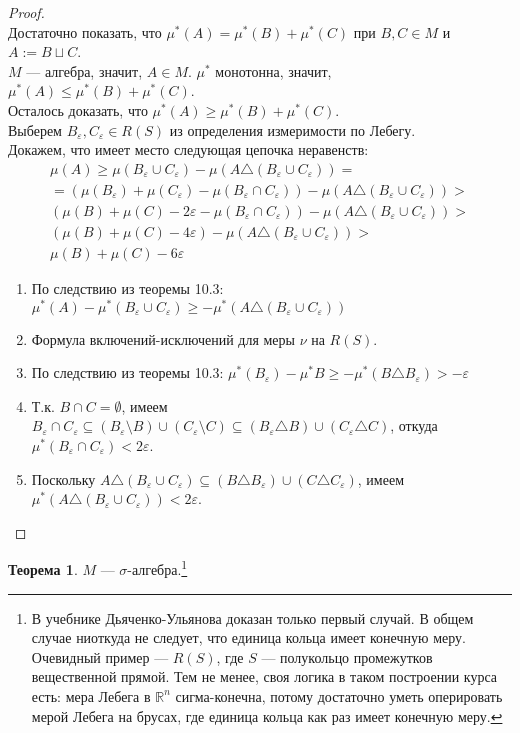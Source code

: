 \documentclass[11pt,a4paper]{report}
\def\eps{\varepsilon}
\def\Real{\mathbb{R}}
\theoremstyle{definition}
\theoremstyle{definition}
\newtheorem{theorem}{Теорема}[section]
\theoremstyle{definition}
\begin{document}
	\begin{proof}$  $\\
		Достаточно показать, что $ \mu^{*}(A) = \mu^{*}(B) + \mu^{*}(C) $ при $ B, C \in M $ и $ A := B \sqcup C $.\\
		$ M $ — алгебра, значит, $ A \in M $. $ \mu^{*} $ монотонна, значит, $ \mu^{*}(A) \le \mu^{*}(B) + \mu^{*}(C) $.\\
		Осталось доказать, что $ \mu^{*}(A) \ge \mu^{*}(B) + \mu^{*}(C) $.\\
		Выберем $ B_{\eps}, C_{\eps} \in R(S) $ из определения измеримости по Лебегу.\\
		Докажем, что имеет место следующая цепочка неравенств:
		\begin{gather}
			\mu(A) \ge \mu(B_{\eps} \cup C_{\eps}) - \mu(A \triangle (B_{\eps} \cup C_{\eps})) =\\
			= (\mu(B_{\eps}) + \mu(C_{\eps}) - \mu(B_{\eps} \cap C_{\eps})) - \mu(A \triangle (B_{\eps} \cup C_{\eps})) >\\
			(\mu(B) + \mu(C) - 2\eps - \mu(B_{\eps} \cap C_{\eps})) - \mu(A \triangle (B_{\eps} \cup C_{\eps})) >\\
			(\mu(B) + \mu(C) - 4\eps) - \mu(A \triangle (B_{\eps} \cup C_{\eps})) >\\
			\mu(B) + \mu(C) - 6\eps
		\end{gather}
		\begin{enumerate}[(1)]
			\item По следствию из теоремы 10.3: $ \mu^{*}(A) - \mu^{*}(B_{\eps} \cup C_{\eps}) \ge -\mu^{*}(A \triangle (B_{\eps} \cup C_{\eps})) $
			\item Формула включений-исключений для меры $ \nu $ на $ R(S) $.
			\item По следствию из теоремы 10.3: $ \mu^{*}(B_{\eps}) - \mu^{*}{B} \ge -\mu^{*}(B \triangle B_{\eps}) > -\eps $
			\item Т.к. $ B \cap C = \emptyset $, имеем $ B_{\eps} \cap C_{\eps} \subseteq (B_{\eps} \setminus B) \cup (C_{\eps} \setminus C) \subseteq (B_{\eps} \triangle B) \cup (C_{\eps} \triangle C) $, откуда $ \mu^{*}(B_{\eps} \cap C_{\eps}) < 2\eps $.
			\item Поскольку $ A \triangle (B_{\eps} \cup C_{\eps}) \subseteq (B \triangle B_{\eps}) \cup (C \triangle C_{\eps}) $, имеем $ \mu^{*}(A \triangle (B_{\eps} \cup C_{\eps})) < 2\eps $.
		\end{enumerate}
	\end{proof}
	\begin{theorem}
		$ M $ — $ \sigma $-алгебра.\footnote{В учебнике Дьяченко-Ульянова доказан только первый случай. В общем случае ниоткуда не следует, что единица кольца имеет конечную меру. Очевидный пример — $ R(S) $, где $ S $ — полукольцо промежутков вещественной прямой. Тем не менее, своя логика в таком построении курса есть: мера Лебега в $ \Real^{n} $ сигма-конечна, потому достаточно уметь оперировать мерой Лебега на брусах, где единица кольца как раз имеет конечную меру. }
	\end{theorem}
\end{document}

